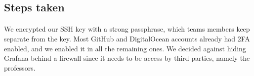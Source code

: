 \subsection{Steps taken}
\paragraph{}
We encrypted our SSH key with a strong passphrase, which teams members keep separate from the key. Most GitHub and DigitalOcean accounts already had 2FA enabled, and we enabled it in all the remaining ones. We decided against hiding Grafana behind a firewall since it needs to be access by third parties, namely the professors.
